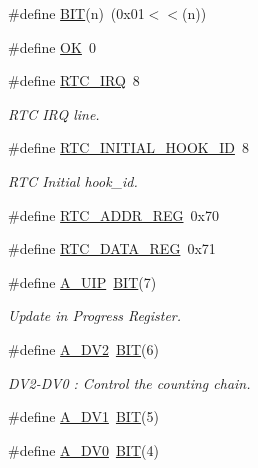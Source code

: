 \begin{DoxyCompactItemize}
\item 
\#define \hyperlink{group___serial_ga3a8ea58898cb58fc96013383d39f482c}{B\+IT}(n)~(0x01$<$$<$(n))
\item 
\#define \hyperlink{group___serial_gaba51915c87d64af47fb1cc59348961c9}{OK}~0
\item 
\#define \hyperlink{group___serial_ga4e22feb6ffbc1cda32fadff5c740dc51}{R\+T\+C\+\_\+\+I\+RQ}~8
\begin{DoxyCompactList}\small\item\em R\+TC I\+RQ line. \end{DoxyCompactList}\item 
\#define \hyperlink{group___serial_gaa03bb5fe5bddcdd5bf15801d73f2c9c2}{R\+T\+C\+\_\+\+I\+N\+I\+T\+I\+A\+L\+\_\+\+H\+O\+O\+K\+\_\+\+ID}~8
\begin{DoxyCompactList}\small\item\em R\+TC Initial hook\+\_\+id. \end{DoxyCompactList}\item 
\#define \hyperlink{group___serial_ga710b98232df2c563009e6f8a6cd18220}{R\+T\+C\+\_\+\+A\+D\+D\+R\+\_\+\+R\+EG}~0x70
\item 
\#define \hyperlink{group___serial_ga2f258a00c59c3f347c8d2d4a75471ce0}{R\+T\+C\+\_\+\+D\+A\+T\+A\+\_\+\+R\+EG}~0x71
\item 
\#define \hyperlink{group___serial_ga98e892db8d518077980341c657099508}{A\+\_\+\+U\+IP}~\hyperlink{group___serial_ga3a8ea58898cb58fc96013383d39f482c}{B\+IT}(7)
\begin{DoxyCompactList}\small\item\em Update in Progress Register. \end{DoxyCompactList}\item 
\#define \hyperlink{group___serial_gaad3e83198dca553658658437932f878e}{A\+\_\+\+D\+V2}~\hyperlink{group___serial_ga3a8ea58898cb58fc96013383d39f482c}{B\+IT}(6)
\begin{DoxyCompactList}\small\item\em D\+V2-\/\+D\+V0 \+: Control the counting chain. \end{DoxyCompactList}\item 
\#define \hyperlink{group___serial_ga4fc9b54f4673ed178656194a52c263c5}{A\+\_\+\+D\+V1}~\hyperlink{group___serial_ga3a8ea58898cb58fc96013383d39f482c}{B\+IT}(5)
\item 
\#define \hyperlink{group___serial_ga571fc22bdbbdc9a64d1592e217b11fcb}{A\+\_\+\+D\+V0}~\hyperlink{group___serial_ga3a8ea58898cb58fc96013383d39f482c}{B\+IT}(4)
$$
\end{DoxyCompactItemize}
